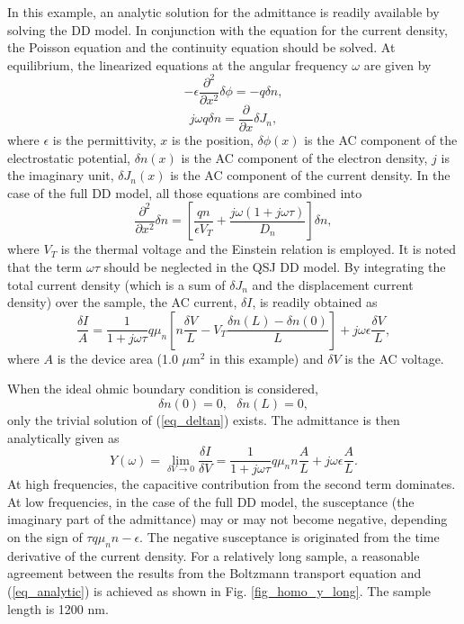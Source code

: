 \documentclass[journal]{IEEEtran}
\newcommand{\revision}[1]{{#1}}
\begin{document}
\revision{In this example, an analytic solution for the admittance is readily available by solving the DD model. 
   In conjunction with the equation for the current density, the Poisson equation and the continuity equation should be solved.
   At equilibrium, the linearized equations at the angular frequency $\omega$ are given by
\begin{equation}
\label{eq_poisson}
-\epsilon \frac{\partial^2 }{\partial x^2} \delta \phi = -q \delta n,
\end{equation}   
\begin{equation}
j\omega q \delta n = \frac{\partial}{\partial x} \delta J_n,
\end{equation}
where $\epsilon$ is the permittivity, $x$ is the position, $\delta \phi(x)$ is the AC component of the electrostatic potential, $\delta n(x)$ is the AC component of the electron density, $j$ is the imaginary unit, $\delta J_n(x)$ is the AC component of the current density.
   In the case of the full DD model, all those equations are combined into
\begin{equation}
\label{eq_deltan}
\frac{\partial^2}{\partial x^2} \delta n = \left[ \frac{q n}{\epsilon V_T} + \frac{j\omega (1+j\omega\tau)}{D_n}  \right] \delta n,
\end{equation}   
where $V_T$ is the thermal voltage and the Einstein relation is employed.
   It is noted that the term $\omega \tau$ should be neglected in the QSJ DD model.
   By integrating the total current density (which is a sum of $\delta J_n$ and the displacement current density) over the sample, the AC current, $\delta I$, is readily obtained as
\begin{equation}
\frac{\delta I}{A} = \frac{1}{1+j \omega \tau} q \mu_n \left[ n \frac{\delta V}{L} - V_T \frac{\delta n(L)-\delta n(0)}{L} \right] + j \omega \epsilon \frac{\delta V}{L},
\end{equation}
where $A$ is the device area (1.0 $\mu$m$^2$ in this example) and $\delta V$ is the AC voltage.
}

\revision{When the ideal ohmic boundary condition is considered,
\begin{equation}
\label{eq_idealbc}
\delta n(0) = 0,~~~ \delta n(L) = 0,
\end{equation}
only the trivial solution of (\ref{eq_deltan}) exists.   
   The admittance is then analytically given as 
\begin{equation}
\label{eq_analytic}
Y(\omega) = \lim_{\delta V \to 0} \frac{\delta I}{\delta V} = \frac{1}{1+j \omega \tau} q \mu_n n \frac{A}{L} + j \omega \epsilon \frac{A}{L}.
\end{equation}
   At high frequencies, the capacitive contribution from the second term dominates. 
   At low frequencies, in the case of the full DD model, the susceptance (the imaginary part of the admittance) may or may not become negative, depending on the sign of $\tau q \mu_n n - \epsilon$.
   The negative susceptance is originated from the time derivative of the current density.
   For a relatively long sample, a reasonable agreement between the results from the Boltzmann transport equation and (\ref{eq_analytic}) is achieved as shown in Fig. \ref{fig_homo_y_long}.
   The sample length is 1200 nm.         
}
\end{document}
